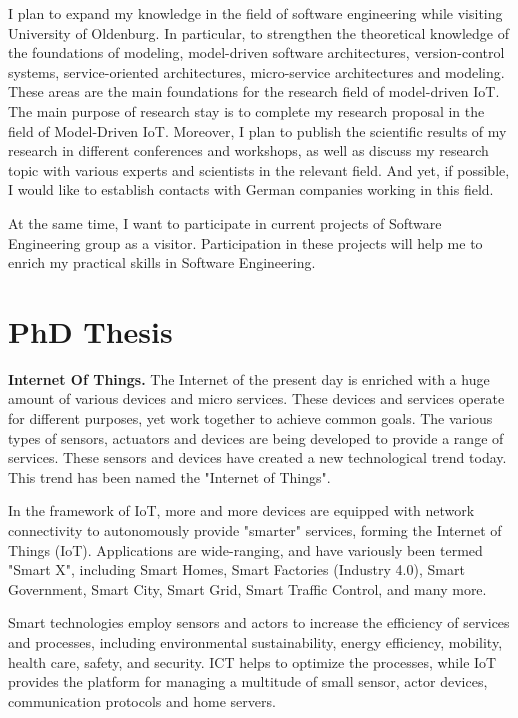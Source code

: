 \documentclass[10pt, oneside]{article}
\begin{document}
I plan to expand my knowledge in the field of software engineering while visiting University of Oldenburg. In particular, to strengthen the theoretical knowledge of the foundations of modeling, model-driven software architectures, version-control systems, service-oriented architectures, micro-service architectures and modeling. These areas are the main foundations for the research field of model-driven IoT. The main purpose of research stay is to complete my research proposal in the field of Model-Driven IoT. Moreover, I plan to publish the scientific results of my research in different conferences and workshops, as well as discuss my research topic with various experts and scientists in the relevant field. And yet, if possible, I would like to establish contacts with German companies working in this field.

At the same time, I want to participate in current projects of Software Engineering group as a visitor. Participation in these projects will help me to enrich my practical skills in Software Engineering.

\section{PhD Thesis}
\textbf{Internet Of Things.} The Internet of the present day is enriched with a huge amount of various devices and micro services. These devices and services operate for different purposes, yet work together to achieve common goals. The various types of sensors, actuators and devices are being developed to provide a range of services. These sensors and devices have created a new technological trend today. This trend has been named the "Internet of Things". 

In the framework of IoT, more and more devices are equipped with network connectivity to autonomously provide "smarter" services, forming the Internet of Things (IoT). Applications are wide-ranging, and have variously been termed "Smart X", including Smart Homes, Smart Factories (Industry 4.0), Smart Government, Smart City, Smart Grid, Smart Traffic Control, and many more.

Smart technologies employ sensors and actors to increase the efficiency of services and processes, including environmental sustainability, energy efficiency, mobility, health care, safety, and security. ICT helps to optimize the processes, while IoT provides the platform for managing a multitude of small sensor, actor devices, communication protocols and home servers.
\end{document}
